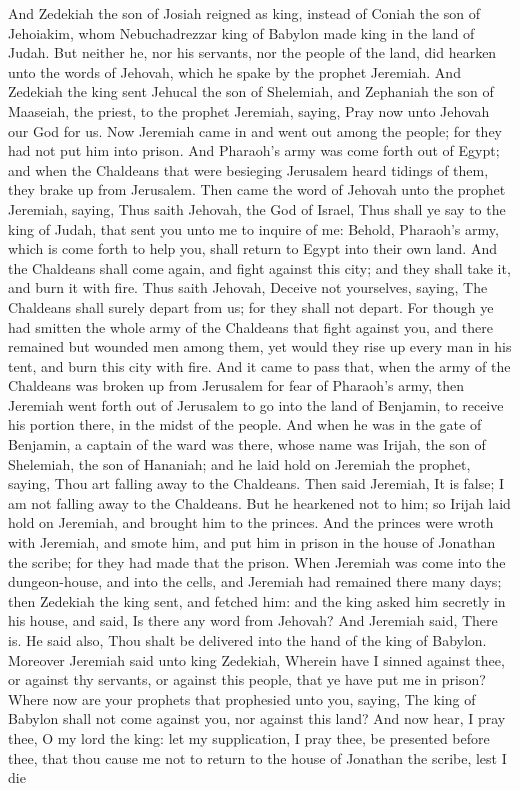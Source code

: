 And Zedekiah the son of Josiah reigned as king, instead of Coniah the son of Jehoiakim, whom Nebuchadrezzar king of Babylon made king in the land of Judah. But neither he, nor his servants, nor the people of the land, did hearken unto the words of Jehovah, which he spake by the prophet Jeremiah.  And Zedekiah the king sent Jehucal the son of Shelemiah, and Zephaniah the son of Maaseiah, the priest, to the prophet Jeremiah, saying, Pray now unto Jehovah our God for us. Now Jeremiah came in and went out among the people; for they had not put him into prison. And Pharaoh’s army was come forth out of Egypt; and when the Chaldeans that were besieging Jerusalem heard tidings of them, they brake up from Jerusalem.  Then came the word of Jehovah unto the prophet Jeremiah, saying, Thus saith Jehovah, the God of Israel, Thus shall ye say to the king of Judah, that sent you unto me to inquire of me: Behold, Pharaoh’s army, which is come forth to help you, shall return to Egypt into their own land. And the Chaldeans shall come again, and fight against this city; and they shall take it, and burn it with fire. Thus saith Jehovah, Deceive not yourselves, saying, The Chaldeans shall surely depart from us; for they shall not depart. For though ye had smitten the whole army of the Chaldeans that fight against you, and there remained but wounded men among them, yet would they rise up every man in his tent, and burn this city with fire.  And it came to pass that, when the army of the Chaldeans was broken up from Jerusalem for fear of Pharaoh’s army, then Jeremiah went forth out of Jerusalem to go into the land of Benjamin, to receive his portion there, in the midst of the people. And when he was in the gate of Benjamin, a captain of the ward was there, whose name was Irijah, the son of Shelemiah, the son of Hananiah; and he laid hold on Jeremiah the prophet, saying, Thou art falling away to the Chaldeans. Then said Jeremiah, It is false; I am not falling away to the Chaldeans. But he hearkened not to him; so Irijah laid hold on Jeremiah, and brought him to the princes. And the princes were wroth with Jeremiah, and smote him, and put him in prison in the house of Jonathan the scribe; for they had made that the prison.  When Jeremiah was come into the dungeon-house, and into the cells, and Jeremiah had remained there many days; then Zedekiah the king sent, and fetched him: and the king asked him secretly in his house, and said, Is there any word from Jehovah? And Jeremiah said, There is. He said also, Thou shalt be delivered into the hand of the king of Babylon. Moreover Jeremiah said unto king Zedekiah, Wherein have I sinned against thee, or against thy servants, or against this people, that ye have put me in prison? Where now are your prophets that prophesied unto you, saying, The king of Babylon shall not come against you, nor against this land? And now hear, I pray thee, O my lord the king: let my supplication, I pray thee, be presented before thee, that thou cause me not to return to the house of Jonathan the scribe, lest I die 
